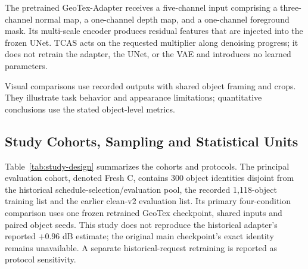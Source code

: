 \documentclass[times,twocolumn,final]{elsarticle}
\begin{document}
The pretrained GeoTex-Adapter receives a five-channel input comprising a three-channel normal map, a one-channel depth map, and a one-channel foreground mask. Its multi-scale encoder produces residual features that are injected into the frozen UNet. TCAS acts on the requested multiplier along denoising progress; it does not retrain the adapter, the UNet, or the VAE and introduces no learned parameters.

Visual comparisons use recorded outputs with shared object framing and crops. They illustrate task behavior and appearance limitations; quantitative conclusions use the stated object-level metrics.

\subsection{Study Cohorts, Sampling and Statistical Units}
\label{subsec:setup}

Table~\ref{tab:study-design} summarizes the cohorts and protocols. The principal evaluation cohort, denoted Fresh C, contains 300 object identities disjoint from the historical schedule-selection/evaluation pool, the recorded 1,118-object training list and the earlier clean-v2 evaluation list. Its primary four-condition comparison uses one frozen retrained GeoTex checkpoint, shared inputs and paired object seeds. This study does not reproduce the historical adapter's reported $+0.96$ dB estimate; the original main checkpoint's exact identity remains unavailable. A separate historical-request retraining is reported as protocol sensitivity.
\end{document}

